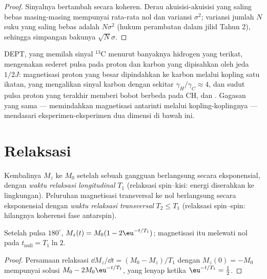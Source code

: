 \begin{proof}
Sinyalnya bertambah secara koheren. Derau akuisisi-akuisisi yang saling
bebas masing-masing mempunyai rata-rata nol dan variansi $\sigma^2$; variansi
jumlah $N$ suku yang saling bebas adalah $N\sigma^2$ (hukum perambatan dalam jilid
Tahun 2), sehingga simpangan bakunya $\sqrt N\sigma$.
\end{proof}

DEPT, yang memilah sinyal ${}^{13}$C menurut banyaknya hidrogen yang terikat,
mengenakan sederet pulsa pada proton dan karbon yang dipisahkan oleh jeda
$1/2J$: magnetisasi proton yang besar dipindahkan ke karbon melalui kopling
satu ikatan, yang mengalikan sinyal karbon dengan sekitar
$\gamma_H/\gamma_C \approx 4$, dan sudut pulsa proton yang terakhir memberi bobot
berbeda pada CH,  dan . Gagasan yang sama --- memindahkan
magnetisasi antarinti melalui kopling-koplingnya --- mendasari
eksperimen-eksperimen dua dimensi di bawah ini.

\section{Relaksasi}

\begin{definition}\label{def:b3:advanced-nmr:relaxation}
Kembalinya $M_z$ ke $M_0$ setelah sebuah gangguan berlangsung secara
eksponensial, dengan \emph{waktu relaksasi
longitudinal} $T_1$ (relaksasi spin--kisi: energi diserahkan ke lingkungan).
Peluruhan magnetisasi transversal ke nol berlangsung secara eksponensial
dengan \emph{waktu relaksasi transversal}
$T_2 \le T_1$ (relaksasi spin--spin: hilangnya koherensi fase antarspin).
\end{definition}

\begin{proposition}\label{prop:b3:advanced-nmr:inversion-recovery}
Setelah pulsa $180^\circ$, $M_z(t) = M_0(1 - 2\eu^{-t/T_1})$; magnetisasi itu
melewati nol pada $t_{\mathrm{null}} = T_1\ln2$.
\end{proposition}

\begin{proof}
Persamaan relaksasi $\dd M_z/\dd t = (M_0 - M_z)/T_1$ dengan $M_z(0) = -M_0$
mempunyai solusi $M_0 - 2M_0\eu^{-t/T_1}$, yang lenyap ketika
$\eu^{-t/T_1} = \frac12$.
\end{proof}

